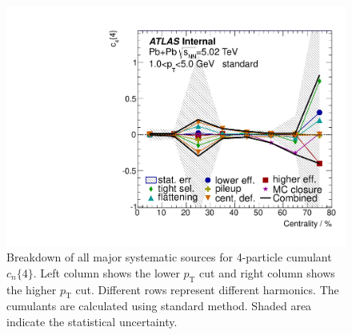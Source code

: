 \begin{figure}[H]
\includegraphics[width=.425\linewidth]{figs/sec_sys/summary/sys_c4_1sub_Har4_Pt1.pdf}
\caption{Breakdown of all major systematic sources for 4-particle cumulant $c_n\{4\}$. Left column shows the lower $p_\text{T}$ cut and right column shows the higher $p_\text{T}$ cut. Different rows represent different harmonics. The cumulants are calculated using standard method. Shaded area indicate the statistical uncertainty.}
\label{fig:sys_sum_c4}
\end{figure}

